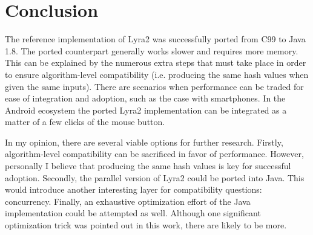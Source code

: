 \chapter{Conclusion}
\label{sec:conclusion}

The reference implementation of Lyra2 was successfully ported from C99 to Java 1.8. The ported counterpart generally works slower and requires more memory. This can be explained by the numerous extra steps that must take place in order to ensure algorithm-level compatibility (i.e. producing the same hash values when given the same inputs). There are scenarios when performance can be traded for ease of integration and adoption, such as the case with smartphones. In the Android ecosystem the ported Lyra2 implementation can be integrated as a matter of a few clicks of the mouse button.

In my opinion, there are several viable options for further research. Firstly, algorithm-level compatibility can be sacrificed in favor of performance. However, personally I believe that producing the same hash values is key for successful adoption. Secondly, the parallel version of Lyra2 could be ported into Java. This would introduce another interesting layer for compatibility questions: concurrency. Finally, an exhaustive optimization effort of the Java implementation could be attempted as well. Although one significant optimization trick was pointed out in this work, there are likely to be more.
